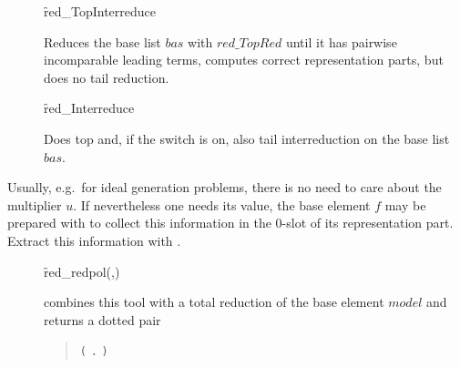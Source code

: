 \begin{description}
\item[]
  \begin{syntax}
    \f{red\_TopInterreduce} 
  \end{syntax}
  \hypertarget{procedure:RED_TOPINTERREDUCE}{}
Reduces the base list $bas$ with $red\_TopRed$ until it
has pairwise incomparable leading terms, computes correct
representation parts, but does no tail reduction.

\item[]
  \begin{syntax}
    \f{red\_Interreduce} 
  \end{syntax}
  \hypertarget{procedure:RED_INTERREDUCE}{}
Does top and, if the switch  is on, also tail interreduction on
the base list $bas$.
\end{description}

Usually, e.g.\ for ideal generation problems, there is no need to care
about the multiplier $u$. If nevertheless one needs its value, the
base element $f$ may be prepared with  to collect
this information in the 0-slot of its representation part. Extract
this information with .
\begin{description}

\item[]
  \begin{syntax}
    \f{red\_redpol}(,)
  \end{syntax}
  \hypertarget{procedure:RED_REDPOL}{}
combines this tool with a total reduction of the base element
$model$ and returns a dotted pair
\begin{quote}
  \texttt{(} \texttt{.} \texttt{)}
\end{quote}
\end{description}

